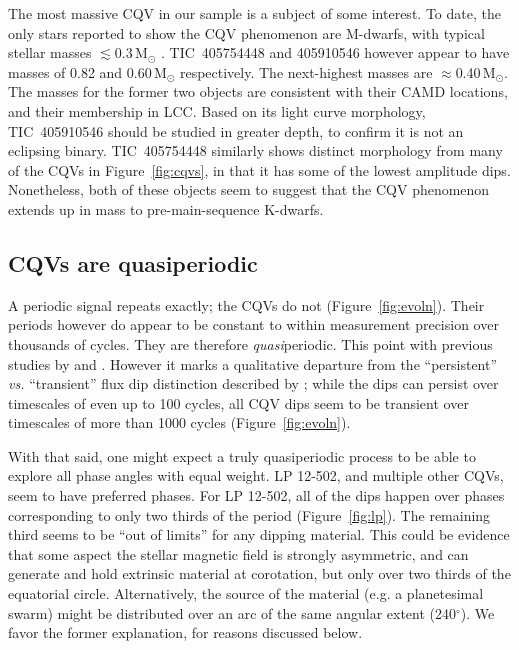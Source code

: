 \documentclass[11pt,twocolumn,tighten]{aastex63}
\begin{document}
The most massive CQV in our sample is a subject of some interest.  To
date, the only stars reported to show the CQV phenomenon are M-dwarfs,
with typical stellar masses $\lesssim$0.3\,M$_\odot$
\citep{2022AJ....163..144G}.  TIC~405754448 and 405910546 however
appear to have masses of 0.82 and 0.60\,M$_\odot$ respectively.  The
next-highest masses are $\approx$0.40\,M$_\odot$.  The masses for the
former two objects are consistent with their CAMD locations, and their
membership in LCC.  Based on its light curve morphology, TIC~405910546
should be studied in greater depth, to confirm it is not an eclipsing
binary.  TIC~405754448 similarly shows distinct morphology from many
of the CQVs in Figure~\ref{fig:cqvs}, in that it has some of the
lowest amplitude dips.  Nonetheless, both of these objects seem to
suggest that the CQV phenomenon extends up in mass to
pre-main-sequence K-dwarfs.


\subsection{CQVs are quasiperiodic}
A periodic signal repeats exactly; the CQVs do not
(Figure~\ref{fig:evoln}).  Their periods however do appear to be
constant to within measurement precision over thousands of cycles.
They are therefore {\it quasi}periodic.  This point with previous
studies by \citet{2022AJ....163..144G} and
\citet{2023ApJ...945..114P}.  However it marks a qualitative departure
from the ``persistent'' {\it vs.} ``transient'' flux dip distinction
described by \citet{2017AJ....153..152S};  while the dips can persist
over timescales of even up to 100 cycles, all CQV dips seem to be
transient over timescales of more than 1000 cycles
(Figure~\ref{fig:evoln}).

With that said, one might expect a truly quasiperiodic process to be
able to explore all phase angles with equal weight.  LP 12-502, and
multiple other CQVs, seem to have preferred phases.  For LP 12-502,
all of the dips happen over phases corresponding to only two thirds of
the period (Figure~\ref{fig:lp}).  The remaining third seems to be
``out of limits'' for any dipping material.  This could be evidence
that some aspect the stellar magnetic field is strongly asymmetric,
and can generate and hold extrinsic material at corotation, but only
over two thirds of the equatorial circle.  Alternatively, the source
of the material (e.g. a planetesimal swarm) might be distributed over
an arc of the same angular extent (240$^\circ$).  We favor the former
explanation, for reasons discussed below.
\end{document}
